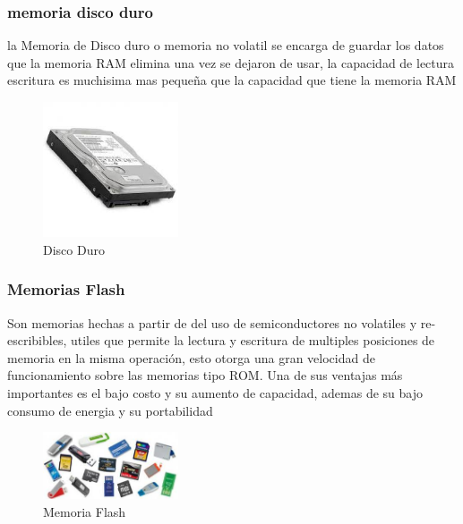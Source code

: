 \documentclass{article}
\begin{document}
        \subsubsection{memoria disco duro}
        la Memoria de Disco duro o memoria no volatil se encarga de guardar los datos que la memoria RAM elimina una vez se dejaron de usar, la capacidad de lectura  escritura es muchisima mas pequeña que la capacidad que tiene la memoria RAM
        
        \begin{figure}[h]
        \includegraphics[width=4cm]{discoDuro.jpg}
        \centering
        \caption{Disco Duro}
        \label{fig:discoDuro}
        \end{figure}
        
        
        \subsubsection{Memorias Flash}
        Son memorias hechas a partir de del uso de semiconductores no volatiles y re-escribibles, utiles que permite la lectura y escritura de multiples posiciones de memoria en la misma operación, esto otorga una gran velocidad de funcionamiento sobre las memorias tipo ROM. Una de sus ventajas más importantes es el bajo costo y su aumento de capacidad, ademas de su bajo consumo de energia y su portabilidad 
        
        \begin{figure}[h]
        \includegraphics[width=4cm]{flash.jpg}
        \centering
        \caption{Memoria Flash}
        \label{fig:flash}
        \end{figure}
    
    
\end{document}
